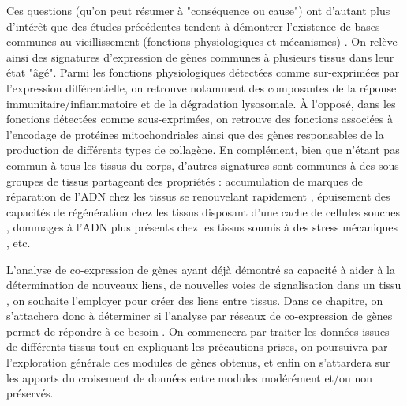 Ces questions (qu'on peut résumer à "conséquence ou cause") ont d'autant plus d'intérêt que des études précédentes tendent à démontrer l'existence de bases communes au vieillissement (fonctions physiologiques et mécanismes) \cite{DeMagalhaes2009a}. On relève ainsi des signatures d'expression de gènes communes à plusieurs tissus dans leur état "âgé". Parmi les fonctions physiologiques détectées comme sur-exprimées par l'expression différentielle, on retrouve notamment des composantes de la réponse immunitaire/inflammatoire et de la dégradation lysosomale. À l'opposé, dans les fonctions détectées comme sous-exprimées, on retrouve des fonctions associées à l'encodage de protéines mitochondriales ainsi que des gènes responsables de la production de différents types de collagène. En complément, bien que n'étant pas commun à tous les tissus du corps, d'autres signatures sont communes à des sous groupes de tissus partageant des propriétés : accumulation de marques de réparation de l'ADN chez les tissus se renouvelant rapidement \cite{Armanios2012}, épuisement des capacités de régénération chez les tissus disposant d'une cache de cellules souches \cite{Ratajczak2017}, dommages à l'ADN plus présents chez les tissus soumis à des stress mécaniques \cite{Kubben2017}, etc.

L'analyse de co-expression de gènes ayant déjà démontré sa capacité à aider à la détermination de nouveaux liens, de nouvelles voies de signalisation dans un tissu \cite{Hughes2000}, on souhaite l'employer pour créer des liens entre tissus. Dans ce chapitre, on s'attachera donc à déterminer si l'analyse par réseaux de co-expression de gènes permet de répondre à ce besoin . On commencera par traiter les données issues de différents tissus tout en expliquant les précautions prises, on poursuivra par l'exploration générale des modules de gènes obtenus, et enfin on s'attardera sur les apports du croisement de données entre modules modérément et/ou non préservés. 




